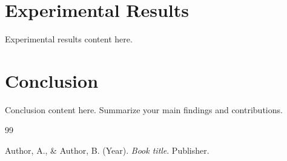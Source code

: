 \documentclass{JoA}
\begin{document}
\section{Experimental Results}

Experimental results content here.

\section{Conclusion}

Conclusion content here. Summarize your main findings and contributions.

\begin{thebibliography}{99}

	Author, A., \& Author, B. (Year).
	\textit{Book title}.
	Publisher.

\end{thebibliography}
\end{document}
